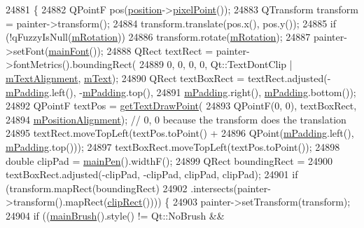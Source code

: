 \begin{DoxyCode}
24881                                           \{
24882   QPointF pos(\hyperlink{class_q_c_p_item_text_a0d228a00e819022b5690c65762721129}{position}->\hyperlink{class_q_c_p_item_position_ae490f9c76ee2ba33752c495d3b6e8fb5}{pixelPoint}());
24883   QTransform transform = painter->transform();
24884   transform.translate(pos.x(), pos.y());
24885   \textcolor{keywordflow}{if} (!qFuzzyIsNull(\hyperlink{class_q_c_p_item_text_ac37df0061552225d2277e1ee3b48f2cb}{mRotation}))
24886     transform.rotate(\hyperlink{class_q_c_p_item_text_ac37df0061552225d2277e1ee3b48f2cb}{mRotation});
24887   painter->setFont(\hyperlink{class_q_c_p_item_text_a23d391bd6471c45e73f45add67ede902}{mainFont}());
24888   QRect textRect = painter->fontMetrics().boundingRect(
24889       0, 0, 0, 0, Qt::TextDontClip | \hyperlink{class_q_c_p_item_text_acdb2e50c38e83da00f083771efbd213f}{mTextAlignment}, \hyperlink{class_q_c_p_item_text_a2dec3e08c11f51639629374ecec3bd62}{mText});
24890   QRect textBoxRect = textRect.adjusted(-\hyperlink{class_q_c_p_item_text_ae7b3ef0ce6046efd4b346d28f2e1fb67}{mPadding}.left(), -\hyperlink{class_q_c_p_item_text_ae7b3ef0ce6046efd4b346d28f2e1fb67}{mPadding}.top(),
24891                                         \hyperlink{class_q_c_p_item_text_ae7b3ef0ce6046efd4b346d28f2e1fb67}{mPadding}.right(), \hyperlink{class_q_c_p_item_text_ae7b3ef0ce6046efd4b346d28f2e1fb67}{mPadding}.bottom());
24892   QPointF textPos = \hyperlink{class_q_c_p_item_text_aa6e478b1ce198eace89157c4cacc3ddc}{getTextDrawPoint}(
24893       QPointF(0, 0), textBoxRect,
24894       \hyperlink{class_q_c_p_item_text_a6c27f7dc1a962a04b32430cf99f04654}{mPositionAlignment}); \textcolor{comment}{// 0, 0 because the transform does the translation}
24895   textRect.moveTopLeft(textPos.toPoint() +
24896                        QPoint(\hyperlink{class_q_c_p_item_text_ae7b3ef0ce6046efd4b346d28f2e1fb67}{mPadding}.left(), \hyperlink{class_q_c_p_item_text_ae7b3ef0ce6046efd4b346d28f2e1fb67}{mPadding}.top()));
24897   textBoxRect.moveTopLeft(textPos.toPoint());
24898   \textcolor{keywordtype}{double} clipPad = \hyperlink{class_q_c_p_item_text_a9ade32d362b22853659201c738269e2a}{mainPen}().widthF();
24899   QRect boundingRect =
24900       textBoxRect.adjusted(-clipPad, -clipPad, clipPad, clipPad);
24901   \textcolor{keywordflow}{if} (transform.mapRect(boundingRect)
24902           .intersects(painter->transform().mapRect(\hyperlink{class_q_c_p_abstract_item_a538e25ff8856534582f5b2b400a46405}{clipRect}()))) \{
24903     painter->setTransform(transform);
24904     \textcolor{keywordflow}{if} ((\hyperlink{class_q_c_p_item_text_a10d6585a030633aa79d5ebc5a437f183}{mainBrush}().style() != Qt::NoBrush &&

\end{DoxyCode}
